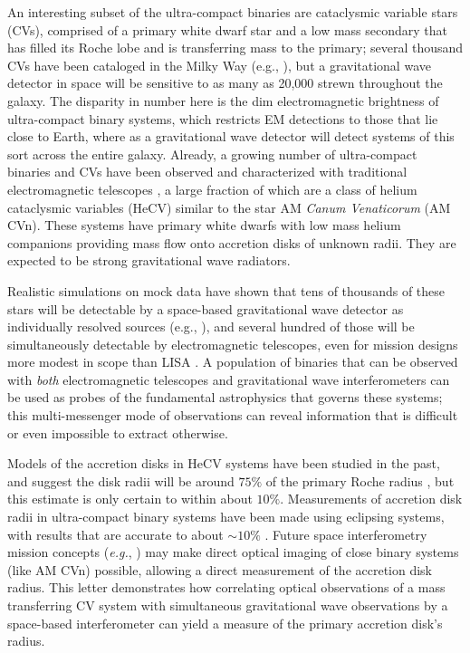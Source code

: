 \documentclass[preprint2]{aastex}
\begin{document}
An interesting subset of the ultra-compact binaries are cataclysmic
variable stars (CVs), comprised of a primary white dwarf star and a
low mass secondary that has filled its Roche lobe and is transferring
mass to the primary; several thousand CVs have been cataloged in the
Milky Way (e.g., \cite{DownesCV}), but a gravitational wave detector 
in space will be sensitive to as many as 20,000 strewn throughout the 
galaxy.  The disparity in number here is the dim electromagnetic 
brightness of ultra-compact binary systems, which restricts EM 
detections to those that lie close to Earth, where as a gravitational 
wave detector will detect systems of this sort across the entire 
galaxy. Already, a growing number of ultra-compact
binaries and CVs have been observed and characterized with traditional
electromagnetic telescopes \citep{NelemansWiki}, a large fraction of
which are a class of helium cataclysmic variables (HeCV) similar to
the star AM {\it Canum Venaticorum} (AM CVn).  These systems have
primary white dwarfs with low mass helium companions providing mass
flow onto accretion disks of unknown radii.  They are expected to be 
strong gravitational wave radiators.

Realistic simulations on mock data \citep{MLDC1,MLDC2} have
shown that tens of thousands of these stars will be detectable by a
space-based gravitational wave detector as individually resolved
sources (e.g., \cite{CrowderCornish}), and several hundred of those
will be simultaneously detectable by electromagnetic telescopes, even
for mission designs more modest in scope than LISA
\citep{LLCN2013}.  A population of binaries that can be
observed with \textit{both} electromagnetic telescopes and
gravitational wave interferometers can be used as probes of the
fundamental astrophysics that governs these systems; this
multi-messenger mode of observations can reveal information that is
difficult or even impossible to extract otherwise.

Models of the accretion disks in HeCV systems have been studied in the
past, and suggest the disk radii will be around $75 \%$ of the primary
Roche radius \citep{Sulkanen81}, but this estimate is only certain to
within about $10 \%$.  Measurements of accretion disk radii in
ultra-compact binary systems have been made using eclipsing systems,
with results that are accurate to about $\sim 10\%$
\citep{1981ApJ...244..579S}.  Future space interferometry mission
concepts (\textit{e.g.}, \cite{SIM,TPF}) may make direct optical
imaging of close binary systems (like AM CVn) possible, allowing a
direct measurement of the accretion disk radius.  This letter
demonstrates how correlating optical observations of a mass
transferring CV system with simultaneous gravitational wave
observations by a space-based interferometer can yield a measure of
the primary accretion disk's radius.
\end{document}
